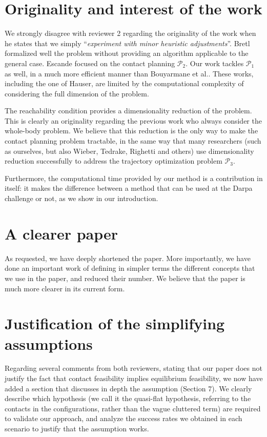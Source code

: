 \documentclass[a4paper]{article}
\begin{document}
\section{Originality and interest of the work}
We strongly disagree with reviewer 2 regarding the originality of the work when he states that we simply ``\textit{experiment with minor heuristic adjustments}''.
Bretl formalized well the problem without providing an algorithm applicable to the general case. Escande focused on the contact planning $\mathcal{P}_2$. 
Our work tackles $\mathcal{P}_1$ as well, in a much more efficient manner than Bouyarmane et al.. 
These works, including the one of Hauser, are limited by the computational complexity of considering the full dimension of the problem.


The reachability condition provides a dimensionality reduction of the problem. This is clearly an originality regarding the previous work who always consider the whole-body problem.
We believe that this reduction is the only way to make the contact planning problem tractable, in the same way that many researchers (such as ourselves, but also Wieber, Tedrake, Righetti and others) use dimensionality reduction successfully to address
the trajectory optimization problem $\mathcal{P}_3$.

Furthermore, the computational time provided by our method is a contribution in itself: it makes the difference
between a method that can be used at the Darpa challenge or not, as we show in our introduction.

\section{A clearer paper}
As requested, we have deeply shortened the paper. More importantly, we have done an important work of defining in simpler terms
the different concepts that we use in the paper, and reduced their number.
We believe that the paper is much more clearer in its current form.

\section{Justification of the simplifying assumptions}
Regarding several comments from both reviewers, stating that our paper does not justify the fact that contact feasibility implies equilibrium feasibility,
we now have added a section that discusses in depth the assumption (Section 7). We clearly describe which hypothesis (we call it the quasi-flat hypothesis, referring
to the contacts in the configurations, rather than the vague cluttered term) are required to validate our approach, and analyze
the success rates we obtained in each scenario to justify that the assumption works.
\end{document}

